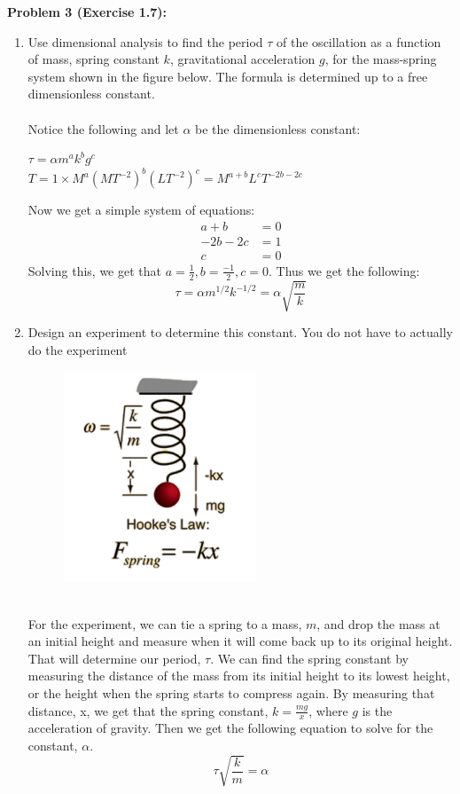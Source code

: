 \documentclass[11pt]{article}
\newenvironment{problem}[1]{\textbf{Problem #1: }}{\newpage}
\begin{document}
	\begin{problem}{3 (Exercise 1.7)}
		\begin{enumerate}[label = (\alph*)]
			\item Use dimensional analysis to find the period $\tau$ of the oscillation as a function of mass, spring constant $k$, gravitational acceleration $g$, for the mass-spring system shown in the figure below. The formula is determined up to a free dimensionless constant. 
			\\ \\
			Notice the following and let $\alpha$ be the dimensionless constant:
			\begin{center}
				$\tau = \alpha m^a k^b g^c$ \\
				$T = 1\times M^a (MT^{-2})^b (LT^{-2})^c = M^{a+b}L^cT^{-2b - 2c}$
			\end{center}
			Now we get a simple system of equations:
			\begin{align*}
			a+b &= 0 \\
			-2b-2c &= 1 \\
			c &= 0
			\end{align*}
			Solving this, we get that $a = \frac{1}{2}, b = \frac{-1}{2}, c = 0$.  Thus we get the following:
			\[\tau = \alpha m^{1/2}k^{-1/2} = \alpha \sqrt{\frac{m}{k}}\]
			\item Design an experiment to determine this constant. You do not have to actually do the experiment
			\begin{figure}[h!]
				\centering
				\includegraphics[]{Photos/HookesLaw.png}
			\end{figure}
			\\
			For the experiment, we can tie a spring to a mass, $m$, and drop the mass at an initial height and measure when it will come back up to its original height. That will determine our period, $\tau$.  We can find the spring constant by measuring the distance of the mass from its initial height to its lowest height, or the height when the spring starts to compress again. By measuring that distance, x, we get that the spring constant, $k = \frac{mg}{x}$, where $g$ is the acceleration of gravity. Then we get the following equation to solve for the constant, $\alpha$.
			\[\tau \sqrt{\frac{k}{m}} = \alpha\]  
		\end{enumerate}
	\end{problem}
	
\end{document}
